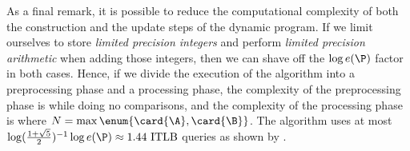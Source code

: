 
As a final remark, it is possible to reduce the computational
complexity of both the construction and the update steps of the dynamic program. If
we limit ourselves to store \emph{limited precision integers} and perform
\emph{limited precision arithmetic} when adding those integers, then we can
shave off the \(\log e(\P)\) factor in both cases. Hence, if we divide the
execution of the algorithm into a preprocessing phase and a processing phase,
the complexity of the preprocessing phase is \BigO{\card{\A}\card{\B}} while doing no
comparisons, and the complexity of the processing phase is 
where \(N = \max \enum{\card{\A},\card{\B}}\). The algorithm uses at most
\(\log(\frac{1+\sqrt{5}}{2})^{-1} \log e(\P) \approx 1.44 \text{ ITLB}\)
queries as shown by \citet*{linial:1984}.
